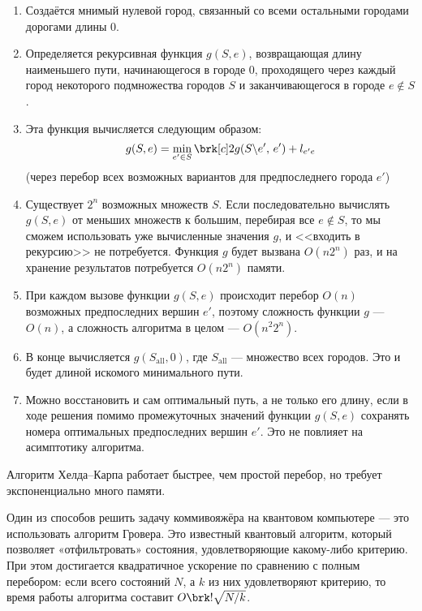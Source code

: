 \begin{enumerate}

    \item Создаётся мнимый нулевой город, связанный со всеми остальными городами дорогами длины 0.
    
    \item Определяется рекурсивная функция $g(S, e)$, возвращающая длину наименьшего пути, начинающегося в городе 0, проходящего через каждый город некоторого подмножества городов $S$ и заканчивающегося в городе $e \notin S$. 
    
    \item Эта функция вычисляется следующим образом:
    \[
    g(S,e) = \min_{e' \in S} \brk[c]2{
        g(S\backslash e',\, e') + l_{e'e}
    }
    \]
    (через перебор всех возможных вариантов для предпоследнего города $e'$)

    \item Существует $2^n$ возможных множеств $S$. Если последовательно вычислять $g(S,e)$ от меньших множеств к большим, перебирая все $e \notin S$, то мы сможем использовать уже вычисленные значения $g$, и <<входить в рекурсию>> не потребуется. Функция $g$ будет вызвана $O(n2^n)$ раз, и на хранение результатов потребуется $O(n2^n)$ памяти.
    
    \item При каждом вызове функции $g(S,e)$ происходит перебор $O(n)$ возможных предпоследних вершин $e'$, поэтому сложность функции $g$ --- $O(n)$, а сложность алгоритма в целом --- $O(n^2 2^n)$.
    
    \item В конце вычисляется $g(S_{\text{all}}, 0)$, где $S_{\text{all}}$ --- множество всех городов. Это и будет длиной искомого минимального пути.
    
    \item Можно восстановить и сам оптимальный путь, а не только его длину, если в ходе решения помимо промежуточных значений функции $g(S,e)$ сохранять номера оптимальных предпоследних вершин $e'$. Это не повлияет на асимптотику алгоритма.

\end{enumerate}

Алгоритм Хелда--Карпа работает быстрее, чем простой перебор, но требует экспоненциально много памяти. %




Один из способов решить задачу коммивояжёра на квантовом компьютере --- это использовать алгоритм Гровера. Это известный квантовый алгоритм, который позволяет «отфильтровать» состояния, удовлетворяющие какому-либо критерию. При этом достигается квадратичное ускорение по сравнению с полным перебором: если всего состояний $N$, а $k$ из них удовлетворяют критерию, то время работы алгоритма составит $O \brk!{\sqrt{N/k}}$.

